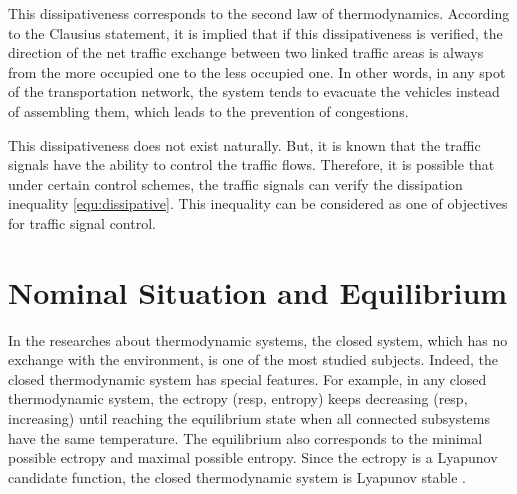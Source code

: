 \documentclass[preprint,authoryear,12pt]{elsarticle}
\begin{document}
This dissipativeness corresponds to the second law of thermodynamics.
According to the Clausius statement, it is implied that if this
dissipativeness is verified, the direction of the net traffic
exchange between two linked traffic areas is always from the more
occupied one to the less occupied one. In other words, in any spot of
the transportation network, the system tends to evacuate the vehicles
instead of assembling them, which leads to the prevention of
congestions.

This dissipativeness does not exist naturally. But, it is known that
the traffic signals have the ability to control the traffic flows.
Therefore, it is possible that under certain control schemes, the
traffic signals can verify the dissipation inequality
\eqref{equ:dissipative}. This inequality can be considered as one of
objectives for traffic signal control.

\section{Nominal Situation and Equilibrium}

In the researches about thermodynamic systems, the closed system,
which has no exchange with the environment, is one of the most
studied subjects. Indeed, the closed thermodynamic system has special
features. For example, in any closed thermodynamic system, the
ectropy (resp, entropy) keeps decreasing (resp, increasing) until
reaching the equilibrium state when all connected subsystems have the
same temperature. The equilibrium also corresponds to the minimal
possible ectropy and maximal possible entropy. Since the ectropy is a
Lyapunov candidate function, the closed thermodynamic system is
Lyapunov stable \citep{haddad_thermodynamic_2005}.
\end{document}
